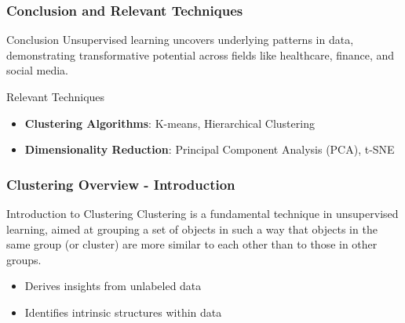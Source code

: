 \documentclass[aspectratio=169]{beamer}
\begin{document}
\begin{frame}[fragile]
    \frametitle{Conclusion and Relevant Techniques}
    \begin{block}{Conclusion}
        Unsupervised learning uncovers underlying patterns in data, demonstrating transformative potential across fields like healthcare, finance, and social media.
    \end{block}

    \begin{block}{Relevant Techniques}
        \begin{itemize}
            \item \textbf{Clustering Algorithms}: K-means, Hierarchical Clustering
            \item \textbf{Dimensionality Reduction}: Principal Component Analysis (PCA), t-SNE
        \end{itemize}
    \end{block}
\end{frame}

\begin{frame}[fragile]
    \frametitle{Clustering Overview - Introduction}
    \begin{block}{Introduction to Clustering}
        Clustering is a fundamental technique in unsupervised learning, aimed at grouping a set of objects in such a way that objects in the same group (or cluster) are more similar to each other than to those in other groups.
    \end{block}
    \begin{itemize}
        \item Derives insights from unlabeled data
        \item Identifies intrinsic structures within data
    \end{itemize}
\end{frame}
\end{document}
